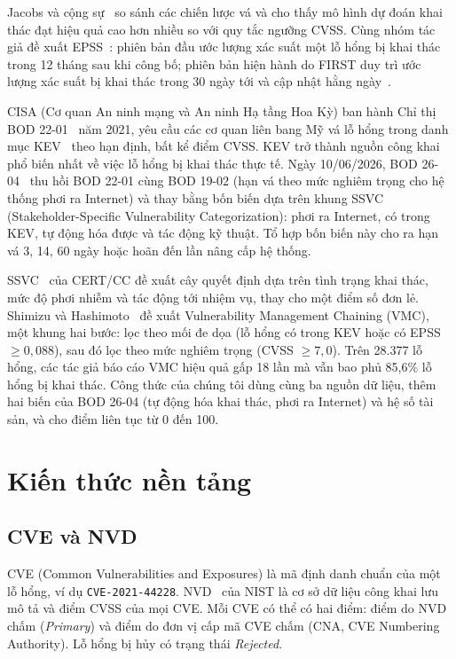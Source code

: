 \documentclass[conference]{IEEEtran}
\begin{document}
Jacobs và cộng sự~\cite{jacobs2020} so sánh các chiến lược vá và cho thấy mô hình dự đoán khai
thác đạt hiệu quả cao hơn nhiều so với quy tắc ngưỡng CVSS. Cùng nhóm tác giả đề xuất
EPSS~\cite{jacobs2021}: phiên bản đầu ước lượng xác suất một lỗ hổng bị khai thác trong 12 tháng
sau khi công bố; phiên bản hiện hành do FIRST duy trì ước lượng xác suất bị khai thác trong 30
ngày tới và cập nhật hằng ngày~\cite{epss}.

CISA (Cơ quan An ninh mạng và An ninh Hạ tầng Hoa Kỳ) ban hành Chỉ thị BOD 22-01~\cite{bod2201} năm 2021, yêu cầu các cơ quan liên bang Mỹ vá lỗ
hổng trong danh mục KEV~\cite{kev} theo hạn định, bất kể điểm CVSS. KEV trở thành nguồn công khai phổ biến nhất về việc lỗ hổng bị khai thác thực tế. Ngày 10/06/2026, BOD 26-04~\cite{bod2604} thu hồi BOD 22-01 cùng BOD 19-02 (hạn vá theo mức nghiêm trọng cho hệ thống phơi ra Internet) và thay bằng bốn biến dựa trên khung SSVC (Stakeholder-Specific Vulnerability Categorization): phơi ra Internet, có trong KEV, tự động hóa được và tác động kỹ thuật. Tổ hợp bốn biến này cho ra hạn vá 3, 14, 60 ngày hoặc hoãn đến lần nâng cấp hệ thống.

SSVC~\cite{ssvc} của CERT/CC đề xuất cây quyết định dựa trên tình trạng khai thác, mức độ phơi
nhiễm và tác động tới nhiệm vụ, thay cho một điểm số đơn lẻ. Shimizu và
Hashimoto~\cite{shimizu2026} đề xuất Vulnerability Management Chaining (VMC), một khung hai bước:
lọc theo mối đe dọa (lỗ hổng có trong KEV hoặc có EPSS $\ge 0{,}088$), sau đó lọc theo mức nghiêm
trọng (CVSS $\ge 7{,}0$). Trên 28.377 lỗ hổng, các tác giả báo cáo VMC hiệu quả gấp 18 lần mà vẫn
bao phủ 85,6\% lỗ hổng bị khai thác. Công thức của chúng tôi dùng cùng ba nguồn dữ liệu, thêm hai biến của BOD 26-04 (tự động hóa khai thác, phơi ra Internet) và hệ số tài sản, và cho điểm liên tục từ 0 đến 100.

\section{Kiến thức nền tảng}\label{sec:nentang}

\subsection{CVE và NVD}
CVE (Common Vulnerabilities and Exposures) là mã định danh chuẩn của một lỗ hổng, ví dụ
\texttt{CVE-2021-44228}. NVD~\cite{nvd} của NIST là cơ sở dữ liệu công khai lưu mô tả và điểm
CVSS của mọi CVE. Mỗi CVE có thể có hai điểm: điểm do NVD chấm (\emph{Primary}) và điểm do đơn vị cấp mã CVE chấm (CNA, CVE Numbering Authority). Lỗ hổng bị hủy có trạng thái \emph{Rejected}.
\end{document}
